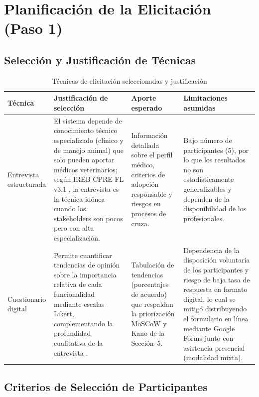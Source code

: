 \documentclass[journal,onecolumn]{IEEEtran}
\begin{document}
\newpage

\section{Planificación de la Elicitación (Paso 1)}

\subsection{Selección y Justificación de Técnicas}

\begin{table}[H]
	\caption{Técnicas de elicitación seleccionadas y justificación}
	\label{tab:tecnicas}
	\begin{tabularx}{\textwidth}{|l|X|X|X|}
		\hline
		\textbf{Técnica} & \textbf{Justificación de selección} & \textbf{Aporte esperado} & \textbf{Limitaciones asumidas} \\
		\hline
		Entrevista estructurada &
		El sistema depende de conocimiento técnico especializado (clínico y de
		manejo animal) que solo pueden aportar médicos veterinarios; según
		IREB CPRE FL v3.1 \cite{ireb2023}, la entrevista es la técnica idónea
		cuando los stakeholders son pocos pero con alta especialización. &
		Información detallada sobre el perfil médico, criterios de adopción
		responsable y riesgos en procesos de cruza. &
		Bajo número de participantes (5), por lo que los resultados no son
		estadísticamente generalizables y dependen de la disponibilidad de los
		profesionales. \\
		\hline
		Cuestionario digital &
		Permite cuantificar tendencias de opinión sobre la importancia relativa
		de cada funcionalidad mediante escalas Likert, complementando la
		profundidad cualitativa de la entrevista \cite{ireb2023}. &
		Tabulación de tendencias (porcentajes de acuerdo) que respaldan la
		priorización MoSCoW y Kano de la Sección~5. &
		Dependencia de la disposición voluntaria de los participantes y riesgo de baja tasa de respuesta en formato digital, lo cual se mitigó distribuyendo el formulario en línea mediante Google Forms junto con asistencia presencial (modalidad mixta). \\
		\hline
	\end{tabularx}
\end{table}

\subsection{Criterios de Selección de Participantes}
\end{document}
